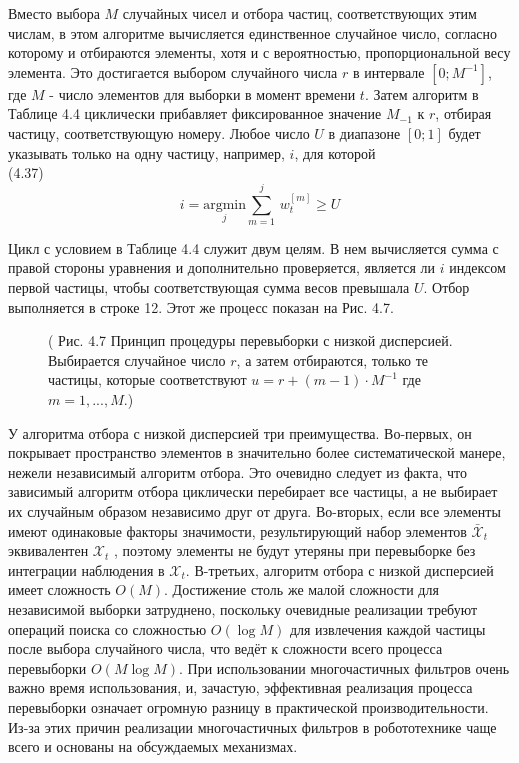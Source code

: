 \documentclass[10pt,a4paper]{article}
\begin{document}
Вместо выбора $M$ случайных чисел и отбора частиц, соответствующих этим числам, в этом алгоритме вычисляется единственное случайное число, согласно которому и отбираются элементы, хотя и с вероятностью, пропорциональной весу элемента. Это достигается выбором случайного числа $r$ в интервале $[0; M^{-1} ]$, где $M$ - число элементов для выборки в момент времени $t$. Затем алгоритм в Таблице 4.4 циклически прибавляет фиксированное значение $M_{-1}$ к $r$, отбирая частицу, соответствующую номеру. Любое число $U$ в диапазоне $[0; 1]$ будет указывать только на одну частицу, например, $i$, для которой\\

(4.37)
$$i=\underset{j}{\text{argmin}}\sum_{m=1}^j\,w_t^{[m]}\geq U$$

Цикл с условием в Таблице 4.4 служит двум целям. В нем вычисляется сумма с правой стороны уравнения и дополнительно проверяется, является ли $i$ индексом первой частицы, чтобы соответствующая сумма весов превышала $U$. Отбор выполняется в строке 12. Этот же процесс показан на Рис. 4.7.
\begin{figure}[H]
	\caption{ (  Рис. 4.7 Принцип процедуры перевыборки с низкой дисперсией. Выбирается случайное число $r$, а затем отбираются, только те частицы, которые соответствуют $u=r+(m-1)\cdot M^{-1}$
	где $m = 1, . . . , M$.)}
	\label{fig:47orig}
\end{figure}

У алгоритма отбора с низкой дисперсией три преимущества. Во-первых, он покрывает пространство элементов в значительно более систематической манере, нежели независимый алгоритм отбора. Это очевидно следует из факта, что зависимый алгоритм отбора циклически перебирает все частицы, а не выбирает их случайным образом независимо друг от друга. Во-вторых, если все элементы имеют одинаковые факторы значимости, результирующий набор элементов $\bar{\mathcal X}_t$ эквивалентен $\mathcal X_t$ , поэтому элементы не будут утеряны при перевыборке без интеграции наблюдения в $\mathcal X_t$. В-третьих, алгоритм отбора с низкой дисперсией имеет сложность $O(M)$. Достижение столь же малой сложности для независимой выборки затруднено, поскольку очевидные реализации требуют операций поиска со сложностью $O(\log M)$ для извлечения каждой частицы после выбора случайного числа, что ведёт к сложности всего процесса перевыборки $O(M \log M)$. При использовании многочастичных фильтров очень важно время использования, и, зачастую, эффективная реализация процесса перевыборки означает огромную разницу в практической производительности. Из-за этих причин реализации многочастичных фильтров в робототехнике чаще всего и основаны на обсуждаемых механизмах.
\end{document}
